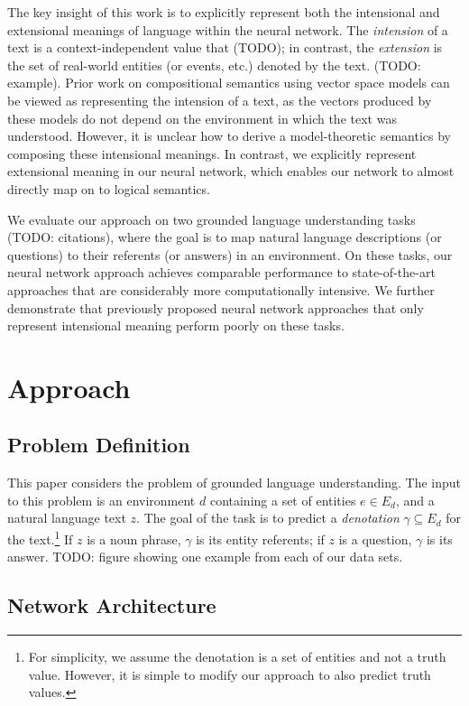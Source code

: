 \documentclass[11pt,letterpaper]{article}
\begin{document}
The key insight of this work is to explicitly represent both the
intensional and extensional meanings of language within the neural
network. The \emph{intension} of a text is a context-independent value
that (TODO); in contrast, the \emph{extension} is the set of
real-world entities (or events, etc.) denoted by the text. (TODO:
example). Prior work on compositional semantics using vector space
models can be viewed as representing the intension of a text, as the
vectors produced by these models do not depend on the environment in
which the text was understood. However, it is unclear how to derive a
model-theoretic semantics by composing these intensional meanings. In
contrast, we explicitly represent extensional meaning in our neural
network, which enables our network to almost directly map on to
logical semantics.

We evaluate our approach on two grounded language understanding tasks
(TODO: citations), where the goal is to map natural language
descriptions (or questions) to their referents (or answers) in an
environment. On these tasks, our neural network approach achieves
comparable performance to state-of-the-art approaches that are
considerably more computationally intensive. We further demonstrate
that previously proposed neural network approaches that only represent
intensional meaning perform poorly on these tasks.


\section{Approach}

\subsection{Problem Definition}

This paper considers the problem of grounded language
understanding. The input to this problem is an environment $d$
containing a set of entities $e \in E_d$, and a natural language text
$z$.  The goal of the task is to predict a \emph{denotation}
$\gamma \subseteq E_d$ for the text.\footnote{For simplicity, we
assume the denotation is a set of entities and not a truth
value. However, it is simple to modify our approach to also predict
truth values.} If $z$ is a noun phrase, $\gamma$ is its entity
referents; if $z$ is a question, $\gamma$ is its answer. TODO: figure
showing one example from each of our data sets.

\subsection{Network Architecture}
\end{document}
